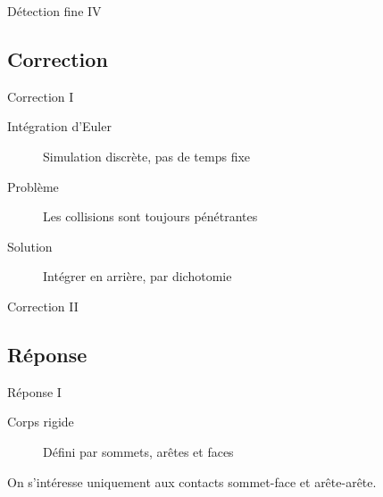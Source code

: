 \documentclass{beamer}
\begin{document}
\begin{frame}{Détection fine IV}
  \begin{figure}
    \centering
    
    
    
    
    
    
  \end{figure}
\end{frame}

\subsection{Correction}

\begin{frame}{Correction I}
  \begin{description}
  \item[Intégration d'Euler] Simulation discrète, pas de temps fixe
  \item[Problème] Les collisions sont toujours pénétrantes
  \end{description}

  \vfill

  \begin{figure}
    \centering
    
  \end{figure}

  \vfill

  \begin{description}
  \item[Solution] Intégrer en arrière, par dichotomie
  \end{description}
\end{frame}

\begin{frame}{Correction II}
  \begin{figure}
    \centering
    
  \end{figure}
\end{frame}

\subsection{Réponse}

\begin{frame}{Réponse I}
  \begin{description}
  \item[Corps rigide] Défini par sommets, arêtes et faces
  \end{description}
  
  \vfill

  On s'intéresse uniquement aux contacts sommet-face et arête-arête.

  \vfill

  \begin{figure}
    \centering
    
    
  \end{figure}
\end{frame}
\end{document}
